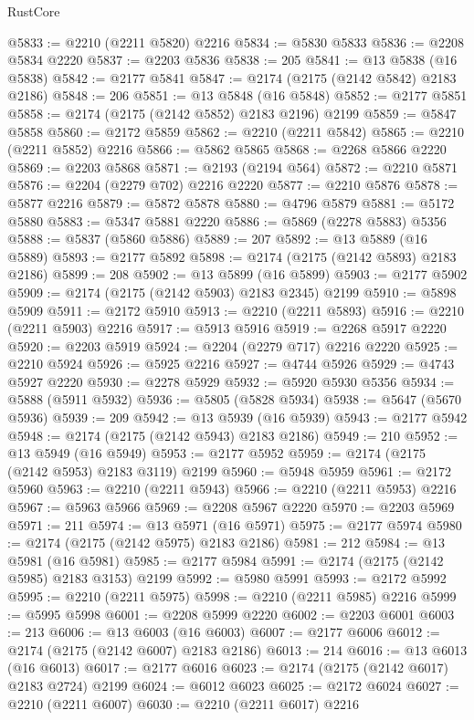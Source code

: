 \begin{lexlean}{RustCore}
\begin{coremodule}
@5833 := @2210 (@2211 @5820) @2216
@5834 := @5830 @5833
@5836 := @2208 @5834 @2220
@5837 := @2203 @5836
@5838 := 205
@5841 := @13 @5838 (@16 @5838)
@5842 := @2177 @5841
@5847 := @2174 (@2175 (@2142 @5842) @2183 @2186)
@5848 := 206
@5851 := @13 @5848 (@16 @5848)
@5852 := @2177 @5851
@5858 := @2174 (@2175 (@2142 @5852) @2183 @2196) @2199
@5859 := @5847 @5858
@5860 := @2172 @5859
@5862 := @2210 (@2211 @5842)
@5865 := @2210 (@2211 @5852) @2216
@5866 := @5862 @5865
@5868 := @2268 @5866 @2220
@5869 := @2203 @5868
@5871 := @2193 (@2194 @564)
@5872 := @2210 @5871
@5876 := @2204 (@2279 @702) @2216 @2220
@5877 := @2210 @5876
@5878 := @5877 @2216
@5879 := @5872 @5878
@5880 := @4796 @5879
@5881 := @5172 @5880
@5883 := @5347 @5881 @2220
@5886 := @5869 (@2278 @5883) @5356
@5888 := @5837 (@5860 @5886)
@5889 := 207
@5892 := @13 @5889 (@16 @5889)
@5893 := @2177 @5892
@5898 := @2174 (@2175 (@2142 @5893) @2183 @2186)
@5899 := 208
@5902 := @13 @5899 (@16 @5899)
@5903 := @2177 @5902
@5909 := @2174 (@2175 (@2142 @5903) @2183 @2345) @2199
@5910 := @5898 @5909
@5911 := @2172 @5910
@5913 := @2210 (@2211 @5893)
@5916 := @2210 (@2211 @5903) @2216
@5917 := @5913 @5916
@5919 := @2268 @5917 @2220
@5920 := @2203 @5919
@5924 := @2204 (@2279 @717) @2216 @2220
@5925 := @2210 @5924
@5926 := @5925 @2216
@5927 := @4744 @5926
@5929 := @4743 @5927 @2220
@5930 := @2278 @5929
@5932 := @5920 @5930 @5356
@5934 := @5888 (@5911 @5932)
@5936 := @5805 (@5828 @5934)
@5938 := @5647 (@5670 @5936)
@5939 := 209
@5942 := @13 @5939 (@16 @5939)
@5943 := @2177 @5942
@5948 := @2174 (@2175 (@2142 @5943) @2183 @2186)
@5949 := 210
@5952 := @13 @5949 (@16 @5949)
@5953 := @2177 @5952
@5959 := @2174 (@2175 (@2142 @5953) @2183 @3119) @2199
@5960 := @5948 @5959
@5961 := @2172 @5960
@5963 := @2210 (@2211 @5943)
@5966 := @2210 (@2211 @5953) @2216
@5967 := @5963 @5966
@5969 := @2208 @5967 @2220
@5970 := @2203 @5969
@5971 := 211
@5974 := @13 @5971 (@16 @5971)
@5975 := @2177 @5974
@5980 := @2174 (@2175 (@2142 @5975) @2183 @2186)
@5981 := 212
@5984 := @13 @5981 (@16 @5981)
@5985 := @2177 @5984
@5991 := @2174 (@2175 (@2142 @5985) @2183 @3153) @2199
@5992 := @5980 @5991
@5993 := @2172 @5992
@5995 := @2210 (@2211 @5975)
@5998 := @2210 (@2211 @5985) @2216
@5999 := @5995 @5998
@6001 := @2208 @5999 @2220
@6002 := @2203 @6001
@6003 := 213
@6006 := @13 @6003 (@16 @6003)
@6007 := @2177 @6006
@6012 := @2174 (@2175 (@2142 @6007) @2183 @2186)
@6013 := 214
@6016 := @13 @6013 (@16 @6013)
@6017 := @2177 @6016
@6023 := @2174 (@2175 (@2142 @6017) @2183 @2724) @2199
@6024 := @6012 @6023
@6025 := @2172 @6024
@6027 := @2210 (@2211 @6007)
@6030 := @2210 (@2211 @6017) @2216

\end{coremodule}
\end{lexlean}
